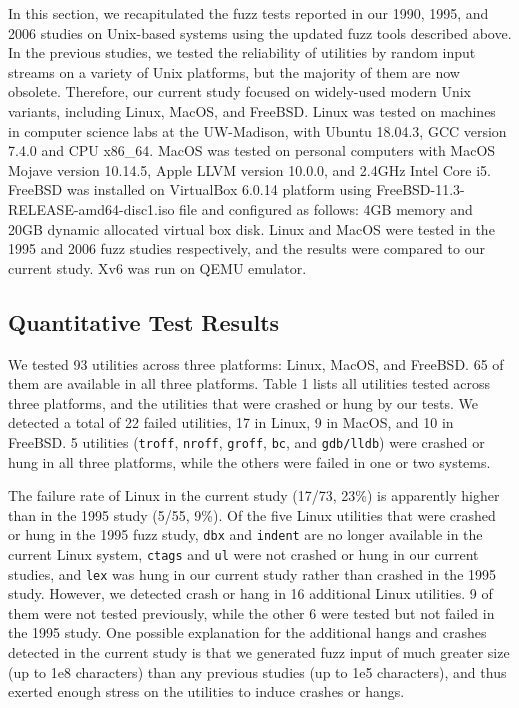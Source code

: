 In this section, we recapitulated the fuzz tests reported in our 1990, 1995, and 2006 studies on Unix-based systems using the updated fuzz tools described above. In the previous studies, we tested the reliability of utilities by random input streams on a variety of Unix platforms, but the majority of them are now obsolete. Therefore, our current study focused on widely-used modern Unix variants, including Linux, MacOS, and FreeBSD. Linux was tested on machines in computer science labs at the UW-Madison, with Ubuntu 18.04.3, GCC version 7.4.0 and CPU x86\_64. MacOS was tested on personal computers with MacOS Mojave version 10.14.5, Apple LLVM version 10.0.0, and 2.4GHz Intel Core i5. FreeBSD was installed on VirtualBox 6.0.14 platform using FreeBSD-11.3-RELEASE-amd64-disc1.iso file and configured as follows: 4GB memory and 20GB dynamic allocated virtual box disk. Linux and MacOS were tested in the 1995 and 2006 fuzz studies respectively, and the results were compared to our current study. Xv6 was run on QEMU emulator.




\subsection{Quantitative Test Results}
We tested 93 utilities across three platforms: Linux, MacOS, and FreeBSD. 65 of them are available in all three platforms. Table 1 lists all utilities tested across three platforms, and the utilities that were crashed or hung by our tests. We detected a total of 22 failed utilities, 17 in Linux, 9 in MacOS, and 10 in FreeBSD. 5 utilities (\texttt{troff}, \texttt{nroff}, \texttt{groff}, \texttt{bc}, and \texttt{gdb/lldb}) were crashed or hung in all three platforms, while the others were failed in one or two systems. 

The failure rate of Linux in the current study (17/73, 23\%) is apparently higher than in the 1995 study (5/55, 9\%). Of the five Linux utilities that were crashed or hung in the 1995 fuzz study, \texttt{dbx} and \texttt{indent} are no longer available in the current Linux system, \texttt{ctags} and \texttt{ul} were not crashed or hung in our current studies, and \texttt{lex} was hung in our current study rather than crashed in the 1995 study. However, we detected crash or hang in 16 additional Linux utilities. 9 of them were not tested previously, while the other 6 were tested but not failed in the 1995 study. One possible explanation for the additional hangs and crashes detected in the current study is that we generated fuzz input of much greater size  (up to 1e8 characters) than any previous studies (up to 1e5 characters), and thus exerted enough stress on the utilities to induce crashes or hangs. 

